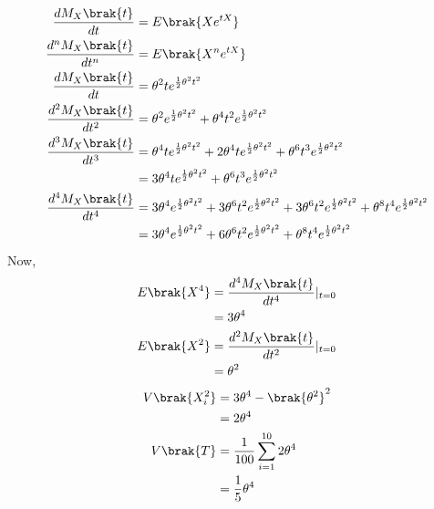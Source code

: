 \documentclass[journal,12pt,onecolumn]{IEEEtran}
\theoremstyle{remark}
\begin{document}
\begin{align}
	\frac{dM_X\brak{t}}{dt} &= E\brak{Xe^{tX}}\\
	\frac{d^nM_X\brak{t}}{dt^n} &= E\brak{X^ne^{tX}}\\
	\frac{dM_X\brak{t}}{dt} &= \theta^2te^{\frac{1}{2}\theta^2t^2}\\
	\frac{d^2M_X\brak{t}}{dt^2} &= \theta^2e^{\frac{1}{2}\theta^2t^2} + \theta^4t^2e^{\frac{1}{2}\theta^2t^2}\\
	\frac{d^3M_X\brak{t}}{dt^3} &= \theta^4te^{\frac{1}{2}\theta^2t^2} + 2\theta^4te^{\frac{1}{2}\theta^2t^2} + \theta^6t^3e^{\frac{1}{2}\theta^2t^2}\\
	&= 3\theta^4te^{\frac{1}{2}\theta^2t^2} + \theta^6t^3e^{\frac{1}{2}\theta^2t^2}\\
	\frac{d^4M_X\brak{t}}{dt^4} &= 3\theta^4e^{\frac{1}{2}\theta^2t^2} + 3\theta^6t^2e^{\frac{1}{2}\theta^2t^2} + 3\theta^6t^2e^{\frac{1}{2}\theta^2t^2} + \theta^8t^4e^{\frac{1}{2}\theta^2t^2}\\
	&= 3\theta^4e^{\frac{1}{2}\theta^2t^2} + 6\theta^6t^2e^{\frac{1}{2}\theta^2t^2} + \theta^8t^4e^{\frac{1}{2}\theta^2t^2}	
\end{align}
Now,
\begin{align}
	E\brak{X^4} &= \frac{d^4M_X\brak{t}}{dt^4}|_{t=0}\\
	&= 3\theta^4\\
	E\brak{X^2} &= \frac{d^2M_X\brak{t}}{dt^2}|_{t=0}\\
	&= \theta^2
\end{align}
\begin{align}
	V\brak{X^2_i} &= 3\theta^4 - \brak{\theta^2}^2\\
	&= 2\theta^4\\
	V\brak{T} &= \frac{1}{100}\sum^{10}_{i=1}{2\theta^4}\\
	&= \frac{1}{5}\theta^4
\end{align}
\end{document}
